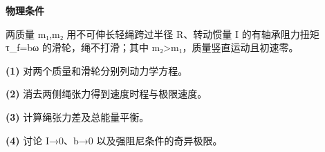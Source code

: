 \textbf{物理条件}\par 两质量 m₁,m₂ 用不可伸长轻绳跨过半径 R、转动惯量 I 的有轴承阻力扭矩 τ\_f=bω 的滑轮，绳不打滑；其中 m₂>m₁，质量竖直运动且初速零。
\par\noindent\textbf{(1)} 对两个质量和滑轮分别列动力学方程。
\par\noindent\textbf{(2)} 消去两侧绳张力得到速度时程与极限速度。
\par\noindent\textbf{(3)} 计算绳张力差及总能量平衡。
\par\noindent\textbf{(4)} 讨论 I→0、b→0 以及强阻尼条件的奇异极限。

